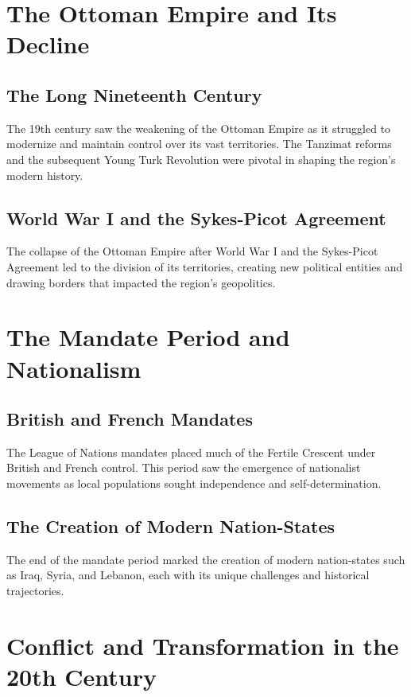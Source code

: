 \documentclass[a4paper,12pt]{book}
\begin{document}
\section{The Ottoman Empire and Its Decline}
\label{sec:ottoman-empire}

\subsection{The Long Nineteenth Century}
The 19th century saw the weakening of the Ottoman Empire as it struggled to modernize and maintain control over its vast territories. The Tanzimat reforms and the subsequent Young Turk Revolution were pivotal in shaping the region's modern history.

\subsection{World War I and the Sykes-Picot Agreement}
The collapse of the Ottoman Empire after World War I and the Sykes-Picot Agreement led to the division of its territories, creating new political entities and drawing borders that impacted the region's geopolitics.

\section{The Mandate Period and Nationalism}
\label{sec:mandate-nationalism}

\subsection{British and French Mandates}
The League of Nations mandates placed much of the Fertile Crescent under British and French control. This period saw the emergence of nationalist movements as local populations sought independence and self-determination.

\subsection{The Creation of Modern Nation-States}
The end of the mandate period marked the creation of modern nation-states such as Iraq, Syria, and Lebanon, each with its unique challenges and historical trajectories.

\section{Conflict and Transformation in the 20th Century}
\label{sec:conflict-transformation}
\end{document}

